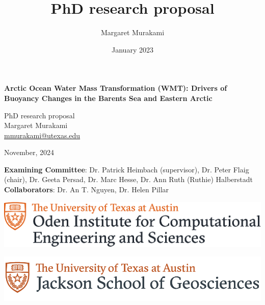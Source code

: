\documentclass[a4paper,12pt]{article}
\author{Margaret Murakami}
\title{PhD research proposal}
\date{January 2023}
\begin{document}
	
	\begin{center}
	\thispagestyle{empty}
		\begin{LARGE}
		\textbf{Arctic Ocean Water Mass Transformation (WMT): Drivers of Buoyancy Changes in the Barents Sea and Eastern Arctic} \\[1 cm] \vfill
		\end{LARGE}
			
			
		\begin{Large}
			PhD research proposal \\ [1 cm]\vfill
			Margaret Murakami \\
			\href{mailto:<email>}{mmurakami@utexas.edu} \\[1 cm]\vfill
			
			
			November, 2024\\[1 cm]\vfill

                \textbf{Examining Committee}: Dr. Patrick Heimbach (supervisor), Dr. Peter Flaig (chair), Dr. Geeta Persad, Dr. Marc Hesse, Dr. Ann Ruth (Ruthie) Halberstadt \\[1 cm]\vfill
                \textbf{Collaborators}: Dr. An T. Nguyen, Dr. Helen Pillar \\[1 cm]\vfill
			
            \begin{center}
                \begin{minipage}{0.45\textwidth}
                    \centering
                    \includegraphics[width=\linewidth]{../figures/CMYK_formal_Oden_ICES.pdf}
                \end{minipage}%
                \hfill
                \begin{minipage}{0.45\textwidth}
                    \centering
                    \includegraphics[width=\linewidth]{../figures/jsg_formal_fullColor.png}
                \end{minipage}
            \end{center}
            
			
		\end{Large}
	\end{center}
	
\end{document}
